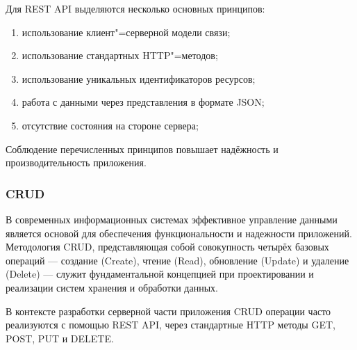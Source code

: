 Для REST API выделяются несколько основных принципов:
\begin{enumerate}
	\item{использование клиент"=серверной модели связи;}
	\item{использование стандартных HTTP"=методов;}
	\item{использование уникальных идентификаторов ресурсов;}
	\item{работа с данными через представления в формате JSON;}
	\item{отсутствие состояния на стороне сервера;}
\end{enumerate}

Соблюдение перечисленных принципов повышает надёжность и производительность приложения.

\subsubsection{CRUD}
В современных информационных системах эффективное управление данными является основой для обеспечения функциональности и надежности приложений. Методология CRUD, представляющая собой совокупность четырёх базовых операций --- создание (Create), чтение (Read), обновление (Update) и удаление (Delete) --- служит фундаментальной концепцией при проектировании и реализации систем хранения и обработки данных. 

В контексте разработки серверной части приложения CRUD операции часто реализуются с помощью REST API, через стандартные HTTP методы GET, POST, PUT и DELETE.
